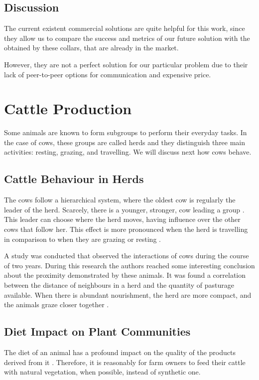 \subsection{Discussion}
\label{subsec:commercial_solutions_discussion}
The current existent commercial solutions are quite helpful for this work, since they allow us
to compare the success and metrics of our future solution with the obtained by these collars,
that are already in the market.

However, they are not a perfect solution for our particular
problem due to their lack of peer-to-peer options for communication and expensive price.


\section{Cattle Production}
\label{sec:cows}
Some animals are known to form subgroups to perform their everyday tasks. In the case of
cows, these groups are called herds and they distinguish three main activities: resting,
grazing, and travelling. We will discuss next how cows behave.

\subsection{Cattle Behaviour in Herds}
\label{subsec:behaviour_herds}
The cows follow a hierarchical system, where the oldest cow is regularly the leader of the
herd. Scarcely, there is a younger, stronger, cow leading a group \cite{Harris2007}. This
leader can choose where the herd moves, having influence over the other cows that follow her.
This effect is more pronounced when the herd is travelling in comparison to when they are
grazing or resting \cite{Vsarova2010}.

A study was conducted that observed the interactions of cows during the course of two
years. During this research the authors reached some interesting conclusion about the proximity
demonstrated by these animals. It was found a correlation between the distance of neighbours
in a herd and the quantity of pasturage available. When there is abundant nourishment, the
herd are more compact, and the animals graze closer together \cite{Harris2007}.

\subsection{Diet Impact on Plant Communities}
\label{subsec:diet}
The diet of an animal has a profound impact on the quality of the products derived from it \cite{Araujo2014}.
Therefore, it is reasonably for farm owners to feed their cattle with natural vegetation, when
possible, instead of synthetic one.

